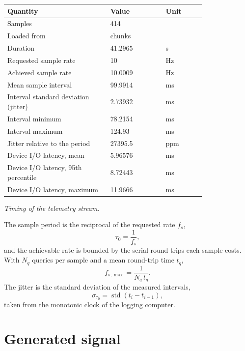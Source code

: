 \documentclass[11pt]{article}
\begin{document}
\begin{center}
\begin{tabular}{@{}p{0.52\linewidth}p{0.28\linewidth}l@{}}
\toprule
\textbf{Quantity} & \textbf{Value} & \textbf{Unit} \\
\midrule
Samples & 414 &  \\
Loaded from & chunks &  \\
Duration & 41.2965 & s \\
Requested sample rate & 10 & Hz \\
Achieved sample rate & 10.0009 & Hz \\
Mean sample interval & 99.9914 & ms \\
Interval standard deviation (jitter) & 2.73932 & ms \\
Interval minimum & 78.2154 & ms \\
Interval maximum & 124.93 & ms \\
Jitter relative to the period & 27395.5 & ppm \\
Device I/O latency, mean & 5.96576 & ms \\
Device I/O latency, 95th percentile & 8.72443 & ms \\
Device I/O latency, maximum & 11.9666 & ms \\
\bottomrule
\end{tabular}

\emph{Timing of the telemetry stream.}
\end{center}

The sample period is the reciprocal of the requested rate $f_s$,
\begin{equation}
  \tau_0 = \frac{1}{f_s},
\end{equation}
and the achievable rate is bounded by the serial round trips each sample
costs. With $N_q$ queries per sample and a mean round-trip time $t_q$,
\begin{equation}
  f_{s,\max} = \frac{1}{N_q\,t_q}.
\end{equation}
The jitter is the standard deviation of the measured intervals,
\begin{equation}
  \sigma_{\tau_0} = \operatorname{std}\left(t_i - t_{i-1}\right),
\end{equation}
taken from the monotonic clock of the logging computer.

\section{Generated signal}
\end{document}
